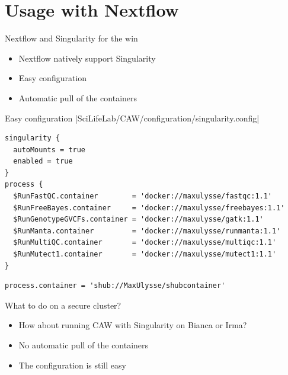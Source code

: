 \documentclass{beamer}
\begin{document}
\section{Usage with Nextflow}

\begin{frame}{Nextflow and Singularity for the win}
	\vspace{-3cm}
	\begin{itemize}
		\item Nextflow natively support Singularity
		\pause
		\item Easy configuration
		\pause
		\item Automatic pull of the containers
	\end{itemize}
\end{frame}

\begin{frame}[fragile]{Easy configuration}
|SciLifeLab/CAW/configuration/singularity.config|
\begin{verbatim}
singularity {
  autoMounts = true
  enabled = true
}
process {
  $RunFastQC.container        = 'docker://maxulysse/fastqc:1.1'
  $RunFreeBayes.container     = 'docker://maxulysse/freebayes:1.1'
  $RunGenotypeGVCFs.container = 'docker://maxulysse/gatk:1.1'
  $RunManta.container         = 'docker://maxulysse/runmanta:1.1'
  $RunMultiQC.container       = 'docker://maxulysse/multiqc:1.1'
  $RunMutect1.container       = 'docker://maxulysse/mutect1:1.1'
}

\end{verbatim}
\pause
\begin{verbatim}
process.container = 'shub://MaxUlysse/shubcontainer'
\end{verbatim}
\end{frame}

\begin{frame}{What to do on a secure cluster?}
	\begin{itemize}
		\item How about running CAW with Singularity on Bianca or Irma?
		\pause
		\item No automatic pull of the containers
		\pause
		\item The configuration is still easy
	\end{itemize}
\end{frame}
\end{document}
